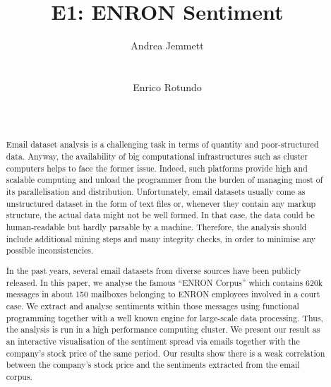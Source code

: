 \documentclass{vldb}
\begin{document}
\title{E1: ENRON Sentiment}


\author{
\alignauthor
Andrea Jemmett\\
       \\
       \\
\alignauthor
Enrico Rotundo\\
       \\
       \\
}


\maketitle

\begin{abstract}
Email dataset analysis is a challenging task in terms of quantity and poor-structured data.
Anyway, the availability of big computational infrastructures such as cluster computers helps to face the former issue.
Indeed, such platforms provide high and scalable computing and unload the programmer from the burden of managing most of its parallelisation and distribution.
Unfortunately, email datasets usually come as unstructured dataset in the form of text files or, whenever they contain any markup structure, the actual data might not be well formed.
In that case, the data could be human-readable but hardly parsable by a machine.
Therefore, the analysis should include additional mining steps and many integrity checks, in order to minimise any possible inconsistencies.  

In the past years, several email datasets from diverse sources have been publicly released.
In this paper, we analyse the famous ``ENRON Corpus'' which contains 620k messages in about 150 mailboxes belonging to ENRON employees involved in a court case.
We extract and analyse sentiments within those messages using functional programming together with a well known engine for large-scale data processing. 
Thus, the analysis is run in a high performance computing cluster.   
We present our result as an interactive visualisation of the sentiment spread via emails together with the company's stock price of the same period.
Our results show there is a weak correlation between the company's stock price and the sentiments extracted from the email corpus.

\end{abstract}
\end{document}
